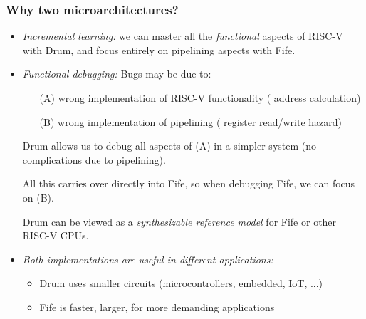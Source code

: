 \begin{frame}
\frametitle{Why two microarchitectures?}

\footnotesize

\begin{itemize}

 \item \emph{Incremental learning:} we can master all the
       \emph{functional} aspects of RISC-V with Drum, and focus
       entirely on pipelining aspects with Fife.

 \PAUSE{}

 \item \emph{Functional debugging:} Bugs may be due to:
       \begin{itemize}\footnotesize
        \item[(A)] wrong implementation of RISC-V functionality ({\eg} address calculation)
        \item[(B)] wrong implementation of pipelining ({\eg} register read/write hazard)
       \end{itemize}

       \vspace{1ex}

       Drum allows us to debug all aspects of (A) in a simpler system
       (no complications due to pipelining).

       \vspace{1ex}
       All this carries over directly into Fife, so when debugging Fife, we can focus on (B).

       \vspace{1ex}
       Drum can be viewed as a \emph{synthesizable reference model}
       for Fife or other RISC-V CPUs.

 \PAUSE{}

 \item \emph{Both implementations are useful in different applications:}

   \begin{itemize}\footnotesize
   \item Drum uses smaller circuits (microcontrollers, embedded, IoT, ...)
   \item Fife is faster, larger, for more demanding applications
   \end{itemize}
\end{itemize}
\end{frame}


